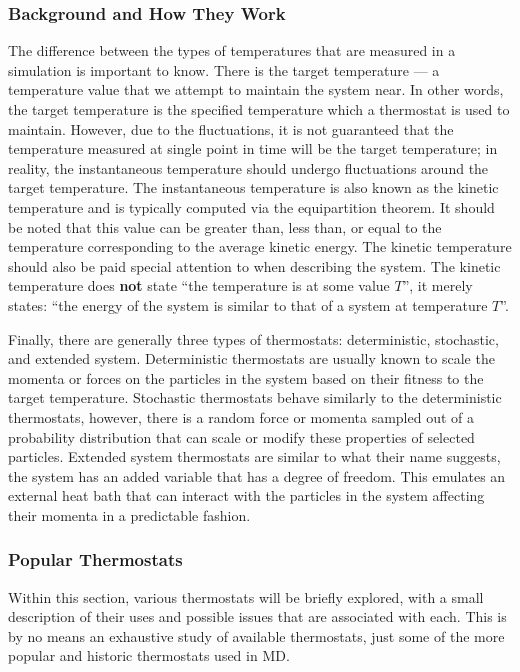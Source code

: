 \documentclass[9pt,bestpractices]{livecoms}
\begin{document}
\subsubsection{Background and How They Work}
The difference between the types of temperatures that are measured in a simulation is important to know.
There is the target temperature --- a temperature value that we attempt to maintain the system near.
In other words, the target temperature is the specified temperature which a thermostat is used to maintain.
However, due to the fluctuations, it is not guaranteed that the temperature measured at single point in time will be the target temperature; in reality, the instantaneous temperature should undergo fluctuations around the target temperature.
The instantaneous temperature is also known as the kinetic temperature and is typically computed via the equipartition theorem.
It should be noted that this value can be greater than, less than, or equal to the temperature corresponding to the average kinetic energy.
The kinetic temperature should also be paid special attention to when describing the system.
The kinetic temperature does \textbf{not} state ``the temperature is at some value $T$'', it merely states: ``the energy of the system is similar to that
of a system at temperature $T$''.

Finally, there are generally three types of thermostats: deterministic, stochastic, and extended system.
Deterministic thermostats are usually known to scale the momenta or forces on the particles in the system based on their fitness to the target temperature.
Stochastic thermostats behave similarly to the deterministic thermostats, however, there is a random force or momenta sampled out of a probability distribution that can scale or modify these properties of selected particles.
Extended system thermostats are similar to what their name suggests, the system has an added variable that has a degree of freedom.
This emulates an external heat bath that can interact with the particles in the system affecting their momenta in a predictable fashion.

\subsubsection{Popular Thermostats}
Within this section, various thermostats will be briefly explored, with a small description of their uses and possible issues that are associated with each.
This is by no means an exhaustive study of available thermostats, just some of the more popular and historic thermostats used in MD.
\end{document}
